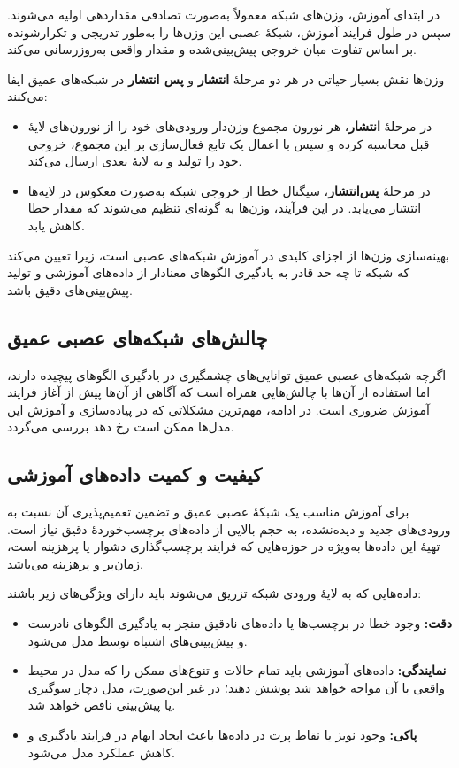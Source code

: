 در ابتدای آموزش، وزن‌های شبکه معمولاً به‌صورت تصادفی مقداردهی اولیه می‌شوند. سپس در طول فرایند آموزش، شبکهٔ عصبی این وزن‌ها را به‌طور تدریجی و تکرارشونده بر اساس تفاوت میان خروجی پیش‌بینی‌شده و مقدار واقعی به‌روزرسانی می‌کند.

وزن‌ها نقش بسیار حیاتی در هر دو مرحلهٔ \textbf{انتشار} و \textbf{پس انتشار} در شبکه‌های عمیق ایفا می‌کنند:

\begin{itemize}
	\item در مرحلهٔ \textbf{انتشار}، هر نورون مجموع وزن‌دار ورودی‌های خود را از نورون‌های لایهٔ قبل محاسبه کرده و سپس با اعمال یک تابع فعال‌سازی بر این مجموع، خروجی خود را تولید و به لایهٔ بعدی ارسال می‌کند.
	
	\item در مرحلهٔ \textbf{پس‌انتشار}، سیگنال خطا از خروجی شبکه به‌صورت معکوس در لایه‌ها انتشار می‌یابد. در این فرآیند، وزن‌ها به گونه‌ای تنظیم می‌شوند که مقدار خطا کاهش یابد.
\end{itemize}

بهینه‌سازی وزن‌ها از اجزای کلیدی در آموزش شبکه‌های عصبی است، زیرا تعیین می‌کند که شبکه تا چه حد قادر به یادگیری الگوهای معنادار از داده‌های آموزشی و تولید پیش‌بینی‌های دقیق باشد.


\subsection*{چالش‌های شبکه‌های عصبی عمیق}

اگرچه شبکه‌های عصبی عمیق توانایی‌های چشمگیری در یادگیری الگوهای پیچیده دارند، اما استفاده از آن‌ها با چالش‌هایی همراه است که آگاهی از آن‌ها پیش از آغاز فرایند آموزش ضروری است. در ادامه، مهم‌ترین مشکلاتی که در پیاده‌سازی و آموزش این مدل‌ها ممکن است رخ دهد بررسی می‌گردد.

\subsection*{کیفیت و کمیت داده‌های آموزشی}

برای آموزش مناسب یک شبکهٔ عصبی عمیق و تضمین تعمیم‌پذیری آن نسبت به ورودی‌های جدید و دیده‌نشده، به حجم بالایی از داده‌های برچسب‌خوردهٔ دقیق نیاز است. تهیهٔ این داده‌ها به‌ویژه در حوزه‌هایی که فرایند برچسب‌گذاری دشوار یا پرهزینه است، زمان‌بر و پرهزینه می‌باشد.

داده‌هایی که به لایهٔ ورودی شبکه تزریق می‌شوند باید دارای ویژگی‌های زیر باشند:

\begin{itemize}
	\item \textbf{دقت:} وجود خطا در برچسب‌ها یا داده‌های نادقیق منجر به یادگیری الگوهای نادرست و پیش‌بینی‌های اشتباه توسط مدل می‌شود.
	\item \textbf{نمایندگی:} داده‌های آموزشی باید تمام حالات و تنوع‌های ممکن را که مدل در محیط واقعی با آن مواجه خواهد شد پوشش دهند؛ در غیر این‌صورت، مدل دچار سوگیری یا پیش‌بینی ناقص خواهد شد.
	\item \textbf{پاکی:} وجود نویز یا نقاط پرت در داده‌ها باعث ایجاد ابهام در فرایند یادگیری و کاهش عملکرد مدل می‌شود.
\end{itemize}


